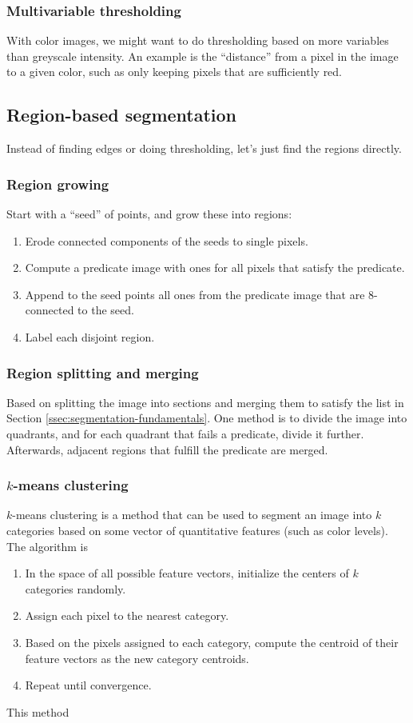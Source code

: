 \subsubsection{Multivariable thresholding}
With color images, we might want to do thresholding based on more variables than greyscale intensity. An example is the ``distance'' from a pixel in the image to a given color, such as only keeping pixels that are sufficiently red.

\subsection{Region-based segmentation}
Instead of finding edges or doing thresholding, let's just find the regions directly.

\subsubsection{Region growing}
Start with a ``seed'' of points, and grow these into regions:
\begin{enumerate}
    \item Erode connected components of the seeds to single pixels.
    \item Compute a predicate image with ones for all pixels that satisfy the predicate.
    \item Append to the seed points all ones from the predicate image that are 8-connected to the seed.
    \item Label each disjoint region.
\end{enumerate}

\subsubsection{Region splitting and merging}
Based on splitting the image into sections and merging them to satisfy the list in Section \ref{ssec:segmentation-fundamentals}. One method is to divide the image into quadrants, and for each quadrant that fails a predicate, divide it further. Afterwards, adjacent regions that fulfill the predicate are merged.

\subsubsection{$k$-means clustering}
$k$-means clustering is a method that can be used to segment an image into $k$ categories based on some vector of quantitative features (such as color levels). The algorithm is
\begin{enumerate}
    \item In the space of all possible feature vectors, initialize the centers of $k$ categories randomly.
    \item Assign each pixel to the nearest category.
    \item Based on the pixels assigned to each category, compute the centroid of their feature vectors as the new category centroids.
    \item Repeat until convergence.
\end{enumerate}
This method

